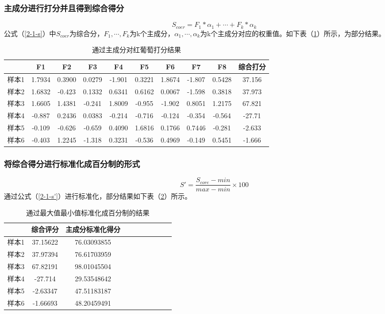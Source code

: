 \documentclass[withoutpreface,bwprint]{cumcmthesis} %
\begin{document}
\subsubsection{主成分进行打分并且得到综合得分}
\begin{equation}
\label{2-1-s}
	S_{coer} = F_1 * \alpha_1 + \cdots + F_k*\alpha_k
\end{equation}
公式（\ref{2-1-s}）中$S_{coer}$为综合分，$F_1,\cdots,F_k$为k个主成分，$\alpha_1,\cdots,\alpha_k$为k个主成分对应的权重值。如下表（\ref{通过主成分对红葡萄打分结果}）所示，为部分结果。

\begin{table}[!htbp]
\centering
\caption{通过主成分对红葡萄打分结果}
\label{通过主成分对红葡萄打分结果}
\begin{tabular}{cccccccccc}
\toprule
 &F1&F2&F3&F4&F5&F6&F7&F8&综合打分\\
\midrule
样本1&1.7934&0.3900&0.0279&-1.901&0.3221&1.8674&-1.807&0.5428&37.156\\
样本2&1.6832&-0.423&0.1332&0.6341&0.6162&0.0067&-1.598&0.3818&37.973\\
样本3&1.6605&1.4381&-0.241&1.8009&-0.955&-1.902&0.8051&1.2175&67.821\\
样本4&-0.887&0.2436&0.0383&-0.214&-0.716&-0.124&-0.354&-0.564&-27.71\\
样本5&-0.109&-0.626&-0.659&0.4090&1.6816&0.1766&0.7446&-0.281&-2.633\\
样本6&-0.403&1.2245&-1.318&0.3231&-0.536&0.4969&-0.149&0.5451&-1.666\\
\bottomrule 
\end{tabular}
\end{table}



\subsubsection{将综合得分进行标准化成百分制的形式}
\begin{equation}
\label{2-1-s'}
	S'=\frac{S_{core}-min}{max-min}\times 100
\end{equation}
通过公式（\ref{2-1-s'}）进行标准化，部分结果如下表（\ref{通过最大值最小值标准化成百分制的结果}）所示。
\begin{table}[!htbp]
\centering
\caption{通过最大值最小值标准化成百分制的结果}
\label{通过最大值最小值标准化成百分制的结果}
\begin{tabular}{cccccccccc}
\toprule
 &综合评分&主成分标准化得分\\
\midrule
样本1&37.15622&76.03093855\\
样本2&37.97394&76.61703959\\
样本3&67.82191&98.01045504\\
样本4&-27.714&29.53548642\\
样本5&-2.63347&47.51183187\\
样本6&-1.66693&48.20459491\\
\bottomrule 
\end{tabular}
\end{table}
\end{document}
